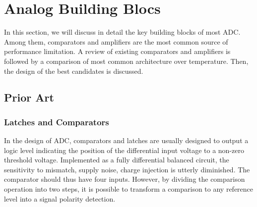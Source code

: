 \chapter{Analog Building Blocs}
\label{sec:analog-building-bloc}

\ifpdf
    \graphicspath{{Chapter7/Figs/Raster/}{Chapter7/Figs/PDF/}{Chapter4/Figs/}}
\else
    \graphicspath{{Chapter7/Figs/Vector/}{Chapter7/Figs/}}
\fi

In this section, we will discuss in detail the key building blocks of most ADC\@. Among them, comparators and amplifiers are the most common source of performance limitation. A review of existing comparators and amplifiers is followed by a comparison of most common architecture over temperature. Then, the design of the best candidates is discussed.

\section{Prior Art}                              %
    \subsection{Latches and Comparators}         %
    \label{sec:latches}
In the design of ADC, comparators and latches are usually designed to output a logic level indicating the position of the differential input voltage to a non-zero threshold voltage. Implemented as a fully differential balanced circuit, the sensitivity to mismatch, supply noise, charge injection is utterly diminished. The comparator should thus have four inputs. However, by dividing the comparison operation into two steps, it is possible to transform a comparison to any reference level into a signal polarity detection.

